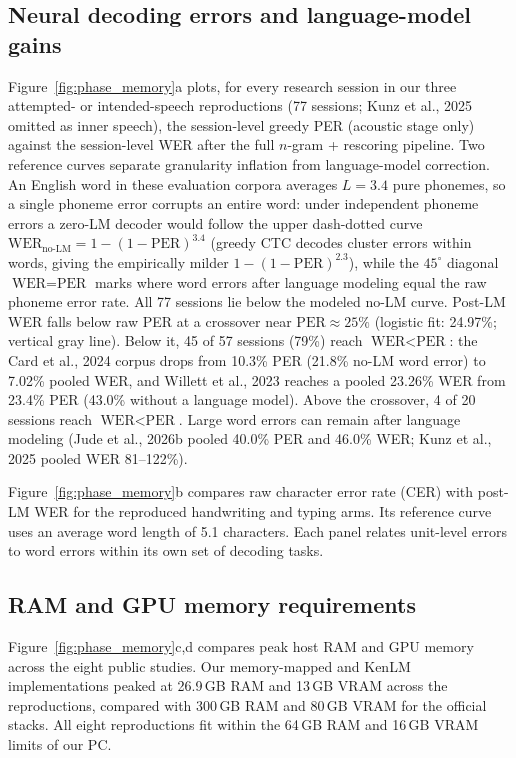 \documentclass[11pt]{article}
\begin{document}
\subsection{Neural decoding errors and language-model gains}

Figure~\ref{fig:phase_memory}a plots, for every research session in our
three attempted- or intended-speech reproductions (77 sessions; Kunz
et al., 2025 omitted as inner speech), the session-level greedy PER
(acoustic stage only) against the session-level WER after the full
$n$-gram + rescoring pipeline. Two reference curves separate
granularity inflation from language-model correction. An English word
in these evaluation corpora averages $L = 3.4$ pure phonemes, so a
single phoneme error corrupts an entire word: under independent
phoneme errors a zero-LM decoder would follow the upper dash-dotted
curve $\text{WER}_{\text{no-LM}} = 1 - (1 - \text{PER})^{3.4}$
(greedy CTC decodes cluster errors within words, giving the
empirically milder $1 - (1 - \text{PER})^{2.3}$), while the
$45^\circ$ diagonal $\text{WER} = \text{PER}$ marks where word errors
after language modeling equal the raw phoneme error rate. All 77 sessions lie below the
modeled no-LM curve. Post-LM WER falls below raw PER at a crossover
near $\text{PER} \approx 25\%$ (logistic fit: 24.97\%; vertical gray
line). Below it, 45 of 57 sessions (79\%) reach
$\text{WER} < \text{PER}$: the Card et al., 2024 corpus drops from
10.3\% PER (21.8\% no-LM word error) to 7.02\% pooled WER, and
Willett et al., 2023 reaches a pooled 23.26\% WER from 23.4\% PER
(43.0\% without a language model). Above the crossover, 4 of 20 sessions
reach $\text{WER} < \text{PER}$. Large word errors can remain after
language modeling (Jude et al., 2026b pooled 40.0\% PER and 46.0\% WER;
Kunz et al., 2025 pooled WER 81--122\%).

Figure~\ref{fig:phase_memory}b compares raw character error rate (CER)
with post-LM WER for the reproduced handwriting and typing arms. Its
reference curve uses an average word length of 5.1 characters. Each
panel relates unit-level errors to word errors within its own set of
decoding tasks.

\subsection{RAM and GPU memory requirements}
\label{sec:memory}

Figure~\ref{fig:phase_memory}c,d compares peak host RAM and GPU
memory across the eight public studies. Our memory-mapped and KenLM
implementations peaked at 26.9\,GB RAM and 13\,GB VRAM across the
reproductions, compared with 300\,GB RAM and 80\,GB VRAM for the
official stacks. All eight reproductions fit within the 64\,GB RAM and
16\,GB VRAM limits of our PC.
\end{document}
